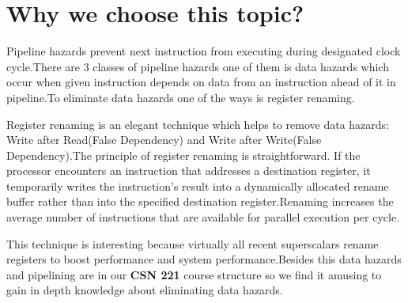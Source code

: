 \chapter{Why we choose this topic?}

Pipeline hazards prevent next instruction from executing during designated clock cycle.There are 3 classes of pipeline hazards one of them is data hazards which occur when given instruction depends on data from an instruction ahead of it in pipeline.To eliminate data hazards one of the ways is register renaming.	

Register renaming is an elegant technique which helps to remove data hazards: Write after Read(False Dependency) and Write after Write(False Dependency).The principle of register renaming is straightforward. If the processor encounters an instruction that addresses a destination register, it temporarily writes the instruction’s result into a dynamically allocated rename buffer rather than into the specified destination register.Renaming increases the average number of instructions that are available for parallel execution per cycle.

This technique is interesting because virtually all recent superscalars rename registers to boost performance and system performance.Besides this data hazards and pipelining are in our \textbf{CSN 221} course structure so we find it amusing to gain in depth knowledge about eliminating data hazards.
